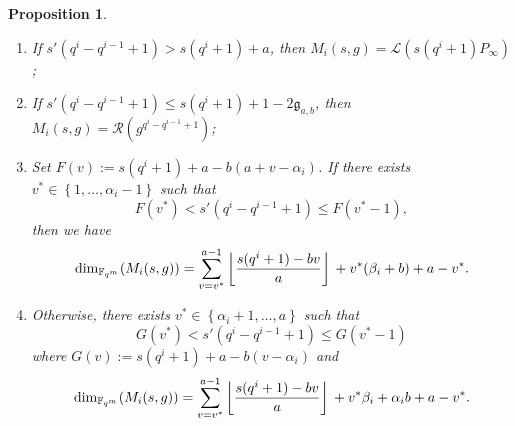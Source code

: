 \documentclass[peerreview]{IEEEtran}
\theoremstyle{plain}
\newtheorem{proposition}[thm]{Proposition}
\theoremstyle{definition}
\theoremstyle{remark}
\newcommand{\calL}{\mathcal{L}}
\newcommand{\calR}{\mathcal{R}}
\newcommand{\fqm}{\mathbb{F}_{q^m}}
\newcommand{\set}[1]{\left\{#1\right\}}
\begin{document}
	\begin{proposition} \label{prop:dim_M_i's}
		\begin{enumerate}
			\item If $s'(q^i-q^{i-1}+1) > s(q^i+1)+a$, then $M_i(s,g) = \calL(s(q^i+1)P_\infty)$;
			
			\item If $s'(q^i-q^{i-1}+1) \leq s(q^i+1)+1-2\mathfrak{g}_{a,b}$, then $M_i(s,g) = \calR(g^{q^{i}-q^{i-1}+1})$;
			
			\item Set $F(v) := s(q^i+1)+a-b(a+v-\alpha_i)$. If there exists $v^* \in \set{1,\dots,\alpha_i-1}$ such that
			$$ F(v^*) < s'(q^i-q^{i-1}+1) \leq  F(v^*-1),$$
			then we have 
\[			\dim_{\fqm}(M_i(s,g)) = \sum\limits_{v=v^*}^{a-1} \left\lfloor \dfrac{s(q^i+1)-bv}{a} \right\rfloor\\ + v^*(\beta_i+b) + a-v^*.\]
			
			\item Otherwise, there exists $v^* \in \set{\alpha_i+1,\dots,a}$ such that
			$$ G(v^*) < s'(q^i-q^{i-1}+1) \leq  G(v^*-1)$$
			where $G(v) := s(q^i+1)+a-b(v-\alpha_i)$ and
	\[\dim_{\fqm}(M_i(s,g)) = \sum\limits_{v=v^*}^{a-1} \left\lfloor \dfrac{s(q^i+1)-bv}{a} \right\rfloor\\ + v^*\beta_i + \alpha_ib +a-v^*.\]
		\end{enumerate}
	\end{proposition}
	
\end{document}
